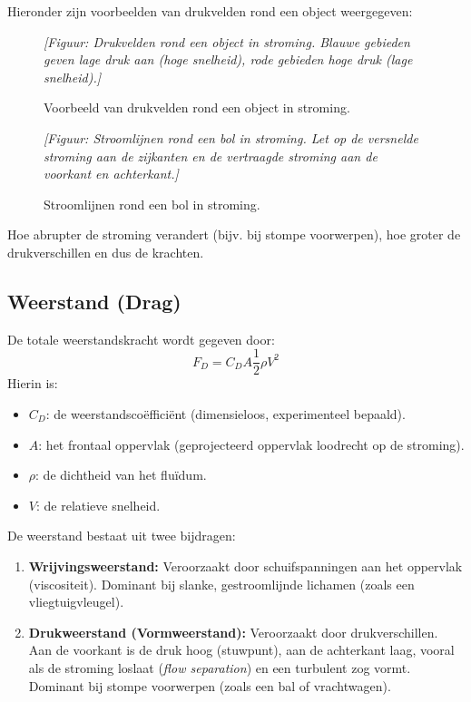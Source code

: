 \documentclass[a4paper,11pt,twoside]{report}
\begin{document}
Hieronder zijn voorbeelden van drukvelden rond een object weergegeven:

\begin{figure}[H]
    \centering
    \textit{[Figuur: Drukvelden rond een object in stroming. Blauwe gebieden geven lage druk aan (hoge snelheid), rode gebieden hoge druk (lage snelheid).]}
    \caption{Voorbeeld van drukvelden rond een object in stroming.}
    \label{fig:pressure_field}
\end{figure}

\begin{figure}[H]
    \centering
    \textit{[Figuur: Stroomlijnen rond een bol in stroming. Let op de versnelde stroming aan de zijkanten en de vertraagde stroming aan de voorkant en achterkant.]}
    \caption{Stroomlijnen rond een bol in stroming.}
    \label{fig:streamlines_ball}
\end{figure}

Hoe abrupter de stroming verandert (bijv. bij stompe voorwerpen), hoe groter de drukverschillen en dus de krachten.


\subsection{Weerstand (Drag)}
De totale weerstandskracht wordt gegeven door:
\[
F_D = C_D A \frac{1}{2} \rho V^2
\]
Hierin is:
\begin{itemize}
    \item $C_D$: de weerstandscoëfficiënt (dimensieloos, experimenteel bepaald).
    \item $A$: het frontaal oppervlak (geprojecteerd oppervlak loodrecht op de stroming).
    \item $\rho$: de dichtheid van het fluïdum.
    \item $V$: de relatieve snelheid.
\end{itemize}

De weerstand bestaat uit twee bijdragen:
\begin{enumerate}
    \item \textbf{Wrijvingsweerstand:} Veroorzaakt door schuifspanningen aan het oppervlak (viscositeit). Dominant bij slanke, gestroomlijnde lichamen (zoals een vliegtuigvleugel).
    \item \textbf{Drukweerstand (Vormweerstand):} Veroorzaakt door drukverschillen. Aan de voorkant is de druk hoog (stuwpunt), aan de achterkant laag, vooral als de stroming loslaat (\textit{flow separation}) en een turbulent zog vormt. Dominant bij stompe voorwerpen (zoals een bal of vrachtwagen).
\end{enumerate}
\end{document}

